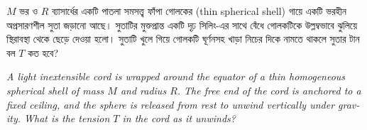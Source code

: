\documentclass[12pt, a4paper]{article}
\begin{document}
\begin{tcolorbox}[questionbox={প্রশ্ন (Question) 31}]
\noindent
$M$ ভর ও $R$ ব্যাসার্ধের একটি পাতলা সমসত্ত্ব ফাঁপা গোলকের (thin spherical shell) গায়ে একটি ভরহীন অপ্রসারণশীল সুতা জড়ানো আছে। সুতাটির মুক্তপ্রান্ত একটি দৃঢ় সিলিং-এর সাথে বেঁধে গোলকটিকে উল্লম্বভাবে ঝুলিয়ে স্থিরাবস্থা থেকে ছেড়ে দেওয়া হলো। সুতাটি খুলে গিয়ে গোলকটি ঘূর্ণনসহ খাড়া নিচের দিকে নামতে থাকলে সুতার টান বল $T$ কত হবে?

\vspace{0.8em}
\begin{english}
\noindent\textit{\color{darkgray}
A light inextensible cord is wrapped around the equator of a thin homogeneous spherical shell of mass $M$ and radius $R$. The free end of the cord is anchored to a fixed ceiling, and the sphere is released from rest to unwind vertically under gravity. What is the tension $T$ in the cord as it unwinds?
}
\end{english}
\end{tcolorbox}
\end{document}
